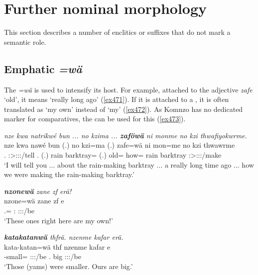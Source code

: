 \section{Further nominal morphology}\label{furthernommorph}

This section describes a number of  enclitics or suffixes that do not mark a semantic role.

\subsection{Emphatic \emph{=wä}} \label{emphathicwae}

The   \emph{=wä} is used to intensify its host. For example, attached to the  adjective \emph{zafe} `old', it means `really long ago' (\ref{ex471}). If it is attached to a  , it is often translated as `my own' instead of `my' (\ref{ex472}). As Komnzo has no dedicated marker for comparatives, the   can be used for this (\ref{ex473}). 

\begin{exe}
	\ex \emph{nze kwa natrikwé bun ... no kzima ... \textbf{zaföwä} ni monme no kzi thwafiyokwrme.}\\
	\gll nze kwa nawé bun (.) no kzi=ma (.) zafe=wä ni mon=me no kzi thwawrme\\
	\Fsg.{\Erg} {\Fut} \Fsg:\Sbj>\Ssg:\Io:\Nonpast:\Ipfv/tell \Ssg.{\Dat} (.) rain barktray={\Char} (.) old={\Emph} {\Fnsg} how={\Ins} rain barktray \Fnsg:\Sbj>\Stpl:\Obj:\Pst:\Dur/make\\
	\trans `I will tell you ... about the rain-making barktray ... a really long time ago ... how we were making the rain-making barktray.'
	\label{ex471}
\end{exe}
\begin{exe}
	\ex \emph{\textbf{nzonewä} zane zf erä!}\\
	\gll nzone=wä zane zf e\\
	\Fsg.\Poss={\Emph} \Dem:{\Prox} {\Imm} \Stpl:\Sbj:\Nonpast:\Ipfv/be\\
	\trans `These ones right here are my own!'
	\label{ex472}
\end{exe}
\begin{exe}
	\ex \emph{\textbf{katakatanwä} thfrä. nzenme kafar erä.}\\
	\gll kata-katan=wä thf nzenme kafar e\\
	\Redup-small={\Emph} \Stpl:\Sbj:\Rpst:\Ipfv/be \Fnsg.{\Poss} big \Stpl:\Sbj:\Nonpast:\Ipfv/be\\
	\trans `Those (yams) were smaller. Ours are big.'
	\label{ex473}
\end{exe}

